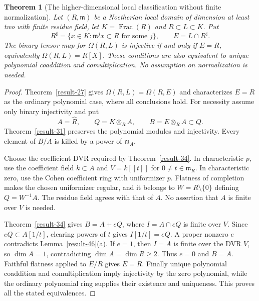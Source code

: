 \documentclass[11pt,a4paper]{article}
\newtheorem{theorem}{Theorem}[section]
\theoremstyle{definition}
\begin{document}
\begin{theorem}[The higher-dimensional local classification without finite normalization]\label{result-38}
Let $(R,\mathfrak m)$ be a Noetherian local domain
of dimension at least two with finite residue field,
let $K=\operatorname{Frac}(R)$ and $R\subset L\subset K$.
Put
\[
 R^\sharp=\{x\in K:\mathfrak m^jx\subset R
                       \text{ for some }j\},\qquad
 E=L\cap R^\sharp.
\]
The binary tensor map for $\Omega(R,L)$ is injective if and
only if $E=R$, equivalently $\Omega(R,L)=R[X]$. These conditions
are also equivalent to unique polynomial coaddition and
comultiplication. No assumption on normalization is needed.
\end{theorem}
\begin{proof}
Theorem~\ref{result-27} gives
$\Omega(R,L)=\Omega(R,E)$ and characterizes $E=R$ as the
ordinary polynomial case, where all conclusions hold.
For necessity assume only binary injectivity and put
\[
 A=\widehat R,\qquad Q=K\otimes_R A,
 \qquad B=E\otimes_R A\subset Q.
\]
Theorem~\ref{result-31} preserves the polynomial modules and
injectivity. Every element of $B/A$ is killed by a power of
$\mathfrak m_A$.

Choose the coefficient DVR required by Theorem~\ref{result-34}.
In characteristic $p$, use the coefficient field $k\subset A$
and $V=k[[t]]$ for $0\ne t\in\mathfrak m_R$. In characteristic
zero, use the Cohen coefficient ring with uniformizer $p$.
Flatness of completion makes the chosen uniformizer regular,
and it belongs to $W=R\setminus\{0\}$ defining $Q=W^{-1}A$.
The residue field agrees with that of $A$. No assertion that
$A$ is finite over $V$ is needed.

Theorem~\ref{result-34} gives $B=A+eQ$, where
$I=A\cap eQ$ is finite over $V$. Since $eQ\subset A[1/t]$,
clearing powers of $t$ gives $I[1/t]=eQ$.
A proper nonzero $e$ contradicts Lemma~\ref{result-46}(a).
If $e=1$, then $I=A$ is finite over the DVR $V$, so
$\dim A=1$, contradicting $\dim A=\dim R\ge2$.
Thus $e=0$ and $B=A$. Faithful flatness applied to $E/R$
gives $E=R$. Finally unique polynomial coaddition and
comultiplication imply injectivity by the zero polynomial,
while the ordinary polynomial ring supplies their existence
and uniqueness. This proves all the stated equivalences.
\end{proof}
\end{document}
